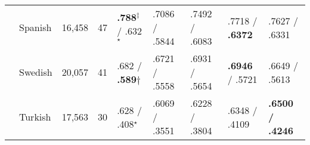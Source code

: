 \begin{table}[h]
\begin{flushleft}
\begin{tabular}{|@{ }l@{ }|@{ }l@{ }|@{ }l@{ }|@{ }l@{ }|@{ }l@{ }|@{ }l@{ }|@{ }l@{ }|@{ }l@{ }|@{ }l@{ }|}
        & Spanish    & 16,458  & 47   & \textbf{.788}$^\ddagger$ / .632$^\star$          & .7086 / .5844 & .7492 / .6083  & .7718 / \textbf{.6372}     & .7627 / .6331 \\
        & Swedish    & 20,057  & 41   & .682 / \textbf{.589}$\dagger$        & .6721 / .5558 & .6931 / .5654  & \textbf{.6946} / .5721     & .6649 / .5613 \\
        & Turkish    & 17,563  & 30   & .628 / .408$^\star$        & .6069 / .3551 & .6228 / .3804  & .6348 / .4109     & \textbf{.6500 / .4246} \\ \hline %
    \end{tabular}
  \end{flushleft}
  \label{tab:multiresults}
\end{table}


